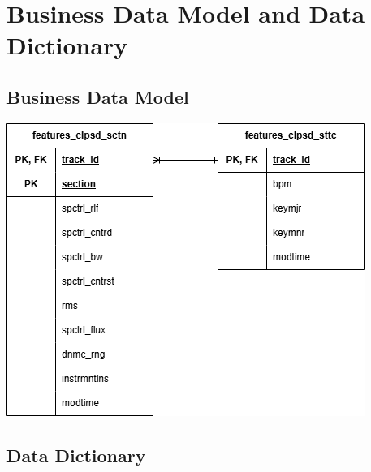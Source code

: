 \documentclass[12pt]{article}
\begin{document}
\section{Business Data Model and Data Dictionary}
\subsection{Business Data Model}
\includegraphics[width=\textwidth]{database.drawio.png}
\subsection{Data Dictionary}
\end{document}

